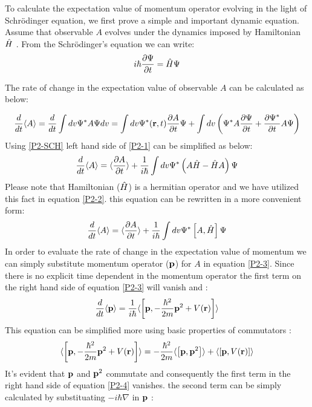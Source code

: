 \begin{homeworkProblem}

 To calculate the expectation value of momentum operator evolving in the light of Schr\"odinger equation, we first prove a simple and important dynamic equation. Assume that observable  $A$ evolves under the dynamics imposed by Hamiltonian $\Hat{H}$ . From  the Schr\"odinger's equation we can write:
\begin{equation}\label{P2-SCH}
i\hbar\dfrac{\partial \Psi}{\partial t}=\Hat{H}\Psi
\end{equation}

The rate of change in the expectation value of observable $A$ can be calculated as below:

\begin{equation}\label{P2-1}
\frac{d}{dt}\langle A\rangle=\frac{d}{dt}\int dv \Psi^* A \Psi dv=\int dv\Psi^*(\mathbf{r},t)\dfrac{\partial A}{\partial t}\Psi+\int dv\left(\Psi^* A\dfrac{\partial \Psi}{\partial t}+\dfrac{\partial \Psi^*}{\partial t}A\Psi\right)
\end{equation}
Using \eqref{P2-SCH} left hand side of \eqref{P2-1} can be simplified  as below:
\begin{equation}\label{P2-2}
 \frac{d}{dt}\langle A\rangle=\langle\dfrac{\partial A}{\partial t}\rangle+ \frac{1}{i\hbar}\int dv\Psi^*\left (A\Hat{H}-\Hat{H}A\right)\Psi 
\end{equation}
Please note that Hamiltonian  ($\Hat{H}$) is a hermitian operator and we have utilized this fact in equation \eqref{P2-2}. this equation can be rewritten in a more convenient form:
\begin{equation}\label{P2-3}
\frac{d}{dt}\langle A\rangle=\langle\dfrac{\partial A}{\partial t}\rangle+ \frac{1}{i\hbar}\int dv\Psi^*\left[A,\Hat{H}\right]\Psi 
\end{equation}
In order to evaluate the rate of change in the expectation value of momentum we can simply substitute momentum operator ($\mathbf{p}$) for $A$ in equation \eqref{P2-3}. Since there is no explicit time dependent in the momentum operator the first term on the right hand side of equation \eqref{P2-3} will vanish  and :
\begin{equation}
\frac{d}{dt}\langle \mathbf{p}\rangle=\frac{1}{i\hbar}\langle\left[\mathbf{p},-\frac{\hbar^2}{2m}\mathbf{p}^2+V(\mathbf{r})\right]\rangle
\end{equation} 
This equation can be simplified more using basic properties of commutators \cite{sakurai}:
\begin{equation}\label{P2-4}
\langle \left[\mathbf{p},-\frac{\hbar^2}{2m}\mathbf{p}^2+V(\mathbf{r})\right]\rangle=-\frac{\hbar^2}{2m}\langle\left[\mathbf{p},\mathbf{p}^2\right]\rangle+\langle\left[\mathbf{p},V(\mathbf{r})\right]\rangle
\end{equation}
It's evident that $\mathbf{p}$ and $\mathbf{p}^2$ commutate and consequently the first term in the right hand side of equation \eqref{P2-4} vanishes. the second term can be simply calculated by substituating $-i\hbar\nabla$ in $\mathbf{p}$ :


\end{homeworkProblem}
